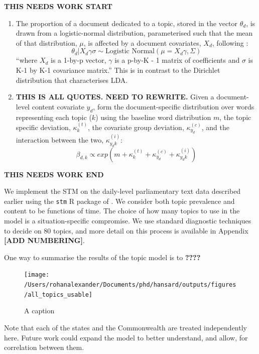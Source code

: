 \documentclass[12pt,]{article}
\providecommand{\tightlist}{%
\setlength{\itemsep}{0pt}\setlength{\parskip}{0pt}}
\theoremstyle{definition}
\theoremstyle{definition}
\theoremstyle{definition}
\theoremstyle{remark}
\begin{document}
\textbf{THIS NEEDS WORK START}

\begin{enumerate}
\def\labelenumi{\arabic{enumi}.}
\tightlist
\item
  The proportion of a document dedicated to a topic, stored in the
  vector \(\theta_d\), is drawn from a logistic-normal distribution,
  parameterised such that the mean of that distribution, \(\mu\), is
  affected by a document covariates, \(X_d\), following
  \citet{RobertsStewartTingley2018}:
  \[\theta_d|X_d\gamma\sigma \sim \mbox{Logistic Normal}(\mu = X_d\gamma, \Sigma)\]
  ``where \(X_d\) is a 1-by-p vector, \(\gamma\) is a p-by-K - 1 matrix
  of coefficients and \(\sigma\) is K-1 by K-1 covariance matrix.'' This
  is in contrast to the Dirichlet distribution that characterises LDA.
\item
  \textbf{THIS IS ALL QUOTES. NEED TO REWRITE.} Given a document-level
  content covariate \(y_d\), form the document-specific distribution
  over words representing each topic (\(k\)) using the baseline word
  distribution \(m\), the topic specific deviation, \(\kappa_k^{(t)}\),
  the covariate group deviation, \(\kappa_{y_d}^{(c)}\), and the
  interaction between the two, \(\kappa_{y_{d}k}^{(i)}\):
  \[\beta_{d,k}\propto exp(m+\kappa^{(t)}_{k} + \kappa_{y_d}^{(c)} + \kappa_{y_{d}k}^{(i)}) \]
\end{enumerate}

\textbf{THIS NEEDS WORK END}

We implement the STM on the daily-level parliamentary text data
described earlier using the \texttt{stm} R package of
\citet{RobertsStewartAiroldiRPackage}. We consider both topic prevalence
and content to be functions of time. The choice of how many topics to
use in the model is a situation-specific compromise. We use standard
diagnostic techniques to decide on 80 topics, and more detail on this
process is available in Appendix \textbf{{[}ADD NUMBERING{]}}.

One way to summarise the results of the topic model is to \textbf{????}

\begin{figure}
\texttt{[image: /Users/rohanalexander/Documents/phd/hansard/outputs/figures/all\_topics\_usable]} \caption{A caption}\label{fig:pressure}
\end{figure}

Note that each of the states and the Commonwealth are treated
independently here. Future work could expand the model to better
understand, and allow, for correlation between them.
\end{document}
